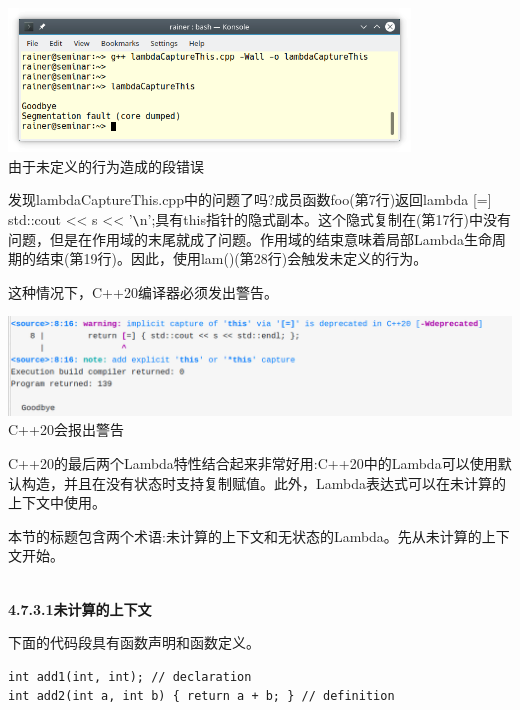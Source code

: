 \begin{center}
\includegraphics[width=0.8\textwidth]{content/3/chapter4/images/42.png}\\
由于未定义的行为造成的段错误
\end{center}

发现lambdaCaptureThis.cpp中的问题了吗?成员函数foo(第7行)返回lambda [=] {std::cout <{}< s <{}< '\verb|\|n';}具有this指针的隐式副本。这个隐式复制在(第17行)中没有问题，但是在作用域的末尾就成了问题。作用域的结束意味着局部Lambda生命周期的结束(第19行)。因此，使用lam()(第28行)会触发未定义的行为。

这种情况下，C++20编译器必须发出警告。

\begin{center}
\includegraphics[width=1.0\textwidth]{content/3/chapter4/images/1-8.png}\\
C++20会报出警告
\end{center}

C++20的最后两个Lambda特性结合起来非常好用:C++20中的Lambda可以使用默认构造，并且在没有状态时支持复制赋值。此外，Lambda表达式可以在未计算的上下文中使用。


本节的标题包含两个术语:未计算的上下文和无状态的Lambda。先从未计算的上下文开始。

\hspace*{\fill} \\ %
\noindent
\textbf{4.7.3.1\hspace{0.2cm}未计算的上下文}

下面的代码段具有函数声明和函数定义。

\begin{lstlisting}[style=styleCXX]
int add1(int, int); // declaration
int add2(int a, int b) { return a + b; } // definition
\end{lstlisting}

